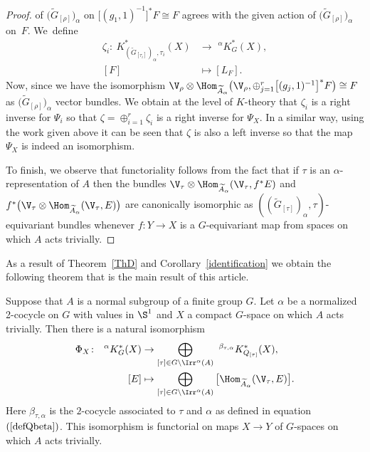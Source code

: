 \begin{proof}
of $\big(\widetilde{G}_{[\rho]}\big)_{\alpha}$ on $\big[(g_{1},1)^{-1}\big]^{\ast} F\cong F$ agrees with
the given action of $\big(\widetilde{G}_{[\rho]}\big)_{\alpha}$ on~$F$. We~define
\begin{align*}
\zeta_{i}\colon\ K^{*}_{\left(\widetilde{G}_{[\tau_{i}]}\right)_{\alpha},\tau_{i}}(X)
&\rightarrow \phantom{i}^{\alpha}K_{G}^{\ast}(X),
\\
[F]&\mapsto [L_{F}].
\end{align*}
Now, since we have the isomorphism
$\V_{\rho}\otimes \Hom_{\widetilde{A}_{\alpha}}
\big(\V_{\rho},\oplus_{j=1}^{r}\big[(g_{j},1)^{-1}\big]^{\ast} F\big)\cong F$ as
$\big(\widetilde{G}_[\rho]\big)_{\alpha}$ vector bundles. We obtain at the level of $K$-theory that
$\zeta_{i}$ is a right inverse for $\Psi_{i}$ so that
$\zeta=\oplus_{i=1}^{r}\zeta_{i}$ is a right inverse for $\Psi_{X}$. In a similar way, using the
work given above it can be seen that $\zeta$ is also a left inverse so that the
map $\Psi_{X}$ is indeed an isomorphism.

To finish, we observe that functoriality follows from the fact that if $\tau$ is an
$\alpha$-representation of $A$ then the bundles
$\V_{\tau}\otimes \Hom_{\widetilde{A}_{\alpha}}(\V_{\tau},f^{\ast} E)$ and
$f^{\ast}\big(\V_{\tau}\otimes \Hom_{\widetilde{A}_{\alpha}}(\V_{\tau},E)\big)$
are canonically isomorphic as $((\widetilde{G}_{[\tau]})_{\alpha},\tau)$-equivariant bundles
whenever $f\colon Y\rightarrow X$ is a
$G$-equivariant map from spaces on which $A$ acts trivially.
\end{proof}


As a result of Theorem~\ref{ThD} and Corollary~\ref{identification} we obtain the following
theorem that is the main result of this article.

\begin{Th}\label{Thmain}
Suppose that $A$ is a normal subgroup of a finite group $G$. Let $\alpha$
be a normalized 2-cocycle on $G$ with values in $\S^{1}$ and $X$ a
compact $G$-space on which $A$ acts trivially.
Then there is a natural isomorphism
\begin{align*}
\Phi_{X}\colon\ \phantom{i}^{\alpha}K_{G}^{\ast}(X)&\rightarrow
\bigoplus_{[\tau]\in G\backslash \Irr^{\alpha}(A)}\phantom{i}
^{\beta_{\tau,\alpha}}K^{\ast}_{Q_{[\tau]}}(X),
\\
[E]&\mapsto \bigoplus_{[\tau]\in G\backslash \Irr^{\alpha}(A)}
\big[\Hom_{\widetilde{A}_{\alpha}}(\V_{\tau},E)\big].
\end{align*}
Here $\beta_{\tau,\alpha}$ is the $2$-cocycle associated to $\tau$ and $\alpha$ as defined in equation~$(\ref{defQbeta})$. This isomorphism is functorial on maps $X\rightarrow Y$ of
$G$-spaces on which $A$ acts trivially.
\end{Th}

%
